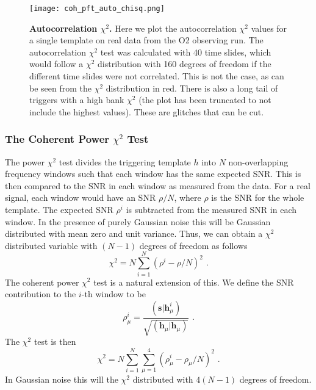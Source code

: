\documentclass[11pt]{cuthesis}
\newcommand{\fs}{\text{ .}}
\begin{document}
\begin{figure} %
\begin{center}
\texttt{[image: coh\_pft\_auto\_chisq.png]}
\end{center}
\caption{\textbf{Autocorrelation $\chi^2$.} Here we plot the autocorrelation $\chi^2$ values for a single template on real data from the O2 observing run. The autocorrelation $\chi^2$ test was calculated with 40 time slides, which would follow a $\chi^2$ distribution with 160 degrees of freedom if the different time slides were not correlated. This is not the case, as can be seen from the $\chi^2$ distribution in red. There is also a long tail of triggers with a high bank $\chi^2$ (the plot has been truncated to not include the highest values). These are glitches that can be cut. }
\label{fig:autochi2}
\end{figure}

\subsubsection{The Coherent Power $\chi^2$ Test}
The power $\chi^2$ test divides the triggering template $h$ into $N$ non-overlapping frequency windows such that each window has the same expected SNR. \cite{allen_chisq} This is then compared to the SNR in each window as measured from the data. For a real signal, each window would have an SNR $\rho/N$, where $\rho$ is the SNR for the whole template. The expected SNR $\rho^i$ is subtracted from the measured SNR in each window. In the presence of purely Gaussian noise this will be Gaussian distributed with mean zero and unit variance. Thus, we can obtain a $\chi^2$ distributed variable with $(N-1)$ degrees of freedom as follows
\begin{equation}
\chi^2 = N \sum_{i=1}^N (\rho^i - \rho/N)^2 \fs
\end{equation}
The coherent power $\chi^2$ test is a natural extension of this. We define the SNR contribution to the $i$-th window to be
\begin{equation}
\rho^i_\mu = \frac{(\textbf{s}|\textbf{h}^i_\mu)}{\sqrt{(\textbf{h}_\mu|\textbf{h}_\mu)}} \fs
\end{equation}
The $\chi^2$ test is then
\begin{equation}
\chi^2 = N \sum_{i=1}^N \sum_{\mu=1}^4 (\rho^i_\mu - \rho_\mu/N)^2 \fs
\end{equation}
In Gaussian noise this will the $\chi^2$ distributed with $4(N-1)$ degrees of freedom. 
\end{document}
